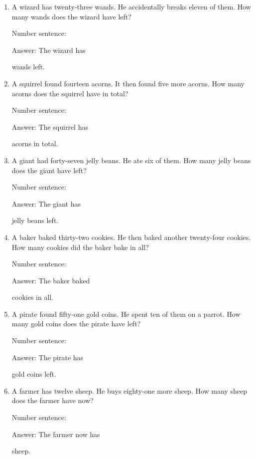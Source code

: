 \documentclass{tufte-book}
\begin{document}
\begin{enumerate}

\item
  A wizard has twenty-three wands. He accidentally breaks eleven of
  them. How many wands does the wizard have left?\medskip\par
  Number sentence:
  \dotfill\medskip\par
  Answer: The wizard has
  \dotfill\medskip\par\mbox{}\dotfill\medskip\par\mbox{}\dotfill\bigskip
  wands left.
\item
  A squirrel found fourteen acorns. It then found five more acorns. How
  many acorns does the squirrel have in total?\medskip\par
  Number sentence:
  \dotfill\medskip\par
  Answer: The squirrel has
  \dotfill\medskip\par\mbox{}\dotfill\medskip\par\mbox{}\dotfill\bigskip
  acorns in total.
\item
  A giant had forty-seven jelly beans. He ate six of them. How many
  jelly beans does the giant have left?\medskip\par
  Number sentence:
  \dotfill\medskip\par
  Answer: The giant has
  \dotfill\medskip\par\mbox{}\dotfill\medskip\par\mbox{}\dotfill\bigskip
  jelly beans left.
\item
  A baker baked thirty-two cookies. He then baked another twenty-four
  cookies. How many cookies did the baker bake in all?\medskip\par
  Number sentence:
  \dotfill\medskip\par
  Answer: The baker baked
  \dotfill\medskip\par\mbox{}\dotfill\medskip\par\mbox{}\dotfill\bigskip
  cookies in all.
\item
  A pirate found fifty-one gold coins. He spent ten of them on a parrot.
  How many gold coins does the pirate have left?\medskip\par
  Number sentence:
  \dotfill\medskip\par
  Answer: The pirate has
  \dotfill\medskip\par\mbox{}\dotfill\medskip\par\mbox{}\dotfill\bigskip
  gold coins left.
\item
  A farmer has twelve sheep. He buys eighty-one more sheep. How many
  sheep does the farmer have now?\medskip\par
  Number sentence:
  \dotfill\medskip\par
  Answer: The farmer now has
  \dotfill\medskip\par\mbox{}\dotfill\medskip\par\mbox{}\dotfill\bigskip
  sheep.
\end{enumerate}
\end{document}
